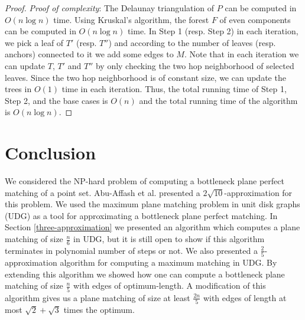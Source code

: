\documentclass[11pt,a4paper]{article}
\begin{document}
\begin{proof}
{\em Proof of complexity}: The Delaunay triangulation of $P$ can be computed in $O(n \log n)$ time. Using Kruskal's algorithm, the forest $F$ of even components can be computed in $O(n\log n)$ time. 
In Step 1 (resp. Step 2) in each iteration, we pick a leaf of $T'$ (resp. $T''$) and according to the number of leaves (resp. anchors) connected to it we add some edges to $M$. Note that in each iteration we can update $T$, $T'$ and $T''$ by only checking the two hop neighborhood of selected leaves. Since the two hop neighborhood is of constant size, we can update the trees in $O(1)$ time in each iteration. 
Thus, the total running time of Step 1, Step 2, and the base cases is $O(n)$ and the total running time of the algorithm is $O(n\log n)$.
\end{proof}

\section{Conclusion}
\label{conclusion}
We considered the NP-hard problem of computing a bottleneck plane perfect matching of a point set. Abu-Affash et al. \cite{Abu-Affash2014} presented a $2\sqrt{10}$-approximation for this problem. We used the maximum plane matching problem in unit disk graphs (UDG) as a tool for approximating a bottleneck plane perfect matching. In Section \ref{three-approximation} we presented an algorithm which computes a plane matching of size $\frac{n}{6}$ in UDG, but it is still open to show if this algorithm terminates in polynomial number of steps or not. We also presented a $\frac{2}{5}$-approximation algorithm for computing a maximum matching in UDG. By extending this algorithm we showed how one can compute a bottleneck plane matching of size $\frac{n}{5}$ with edges of optimum-length. A modification of this algorithm gives us a plane matching of size at least $\frac{2n}{5}$ with  edges of length at most $\sqrt{2}+\sqrt{3}$ times the optimum. 



\end{document}
